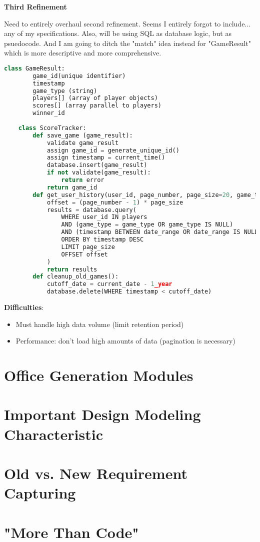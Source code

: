\documentclass[12pt]{article}
\begin{document}
\textbf{Third Refinement}

Need to entirely overhaul second refinement. Seems I entirely forgot to include... any of my specifications. 
Also, will be using SQL as database logic, but as psuedocode. And I am going to ditch the "match" idea instead for
"GameResult" which is more descriptive and more comprehensive.

\begin{lstlisting}[language=Python]
    class GameResult:
        game_id(unique identifier)
        timestamp
        game_type (string)
        players[] (array of player objects)
        scores[] (array parallel to players)
        winner_id
    
    class ScoreTracker:
        def save_game (game_result):
            validate game_result
            assign game_id = generate_unique_id()
            assign timestamp = current_time()
            database.insert(game_result)
            if not validate(game_result):
                return error
            return game_id
        def get_user_history(user_id, page_number, page_size=20, game_type=None, date_range=None):
            offset = (page_number - 1) * page_size
            results = database.query(
                WHERE user_id IN players
                AND (game_type = game_type OR game_type IS NULL)
                AND (timestamp BETWEEN date_range OR date_range IS NULL)
                ORDER BY timestamp DESC
                LIMIT page_size
                OFFSET offset
            )
            return results
        def cleanup_old_games():
            cutoff_date = current_date - 1_year
            database.delete(WHERE timestamp < cutoff_date)
\end{lstlisting}

\textbf{Difficulties}:
\begin{itemize}
    \item Must handle high data volume (limit retention period)
    \item Performance: don't load high amounts of data (pagination is necessary)
\end{itemize}

\section{Office Generation Modules}

\section{Important Design Modeling Characteristic}

\section{Old vs. New Requirement Capturing}

\section{"More Than Code"}
\end{document}
